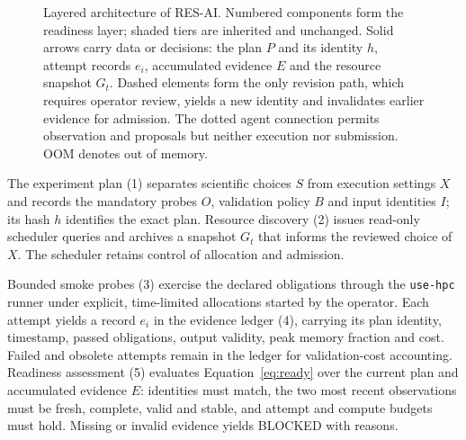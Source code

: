 \documentclass[pdflatex,sn-mathphys-num]{sn-jnl}
\theoremstyle{thmstylethree}
\newcommand{\tool}{\textsc{RES-AI}}
\newcommand{\upstream}{\texttt{use-hpc}}
\newcommand{\code}[1]{\texttt{#1}}
\begin{document}
\begin{figure}[t]


\caption{Layered architecture of \tool{}. Numbered components form the readiness layer; shaded tiers are inherited and unchanged. Solid arrows carry data or decisions: the plan $P$ and its identity $h$, attempt records $e_i$, accumulated evidence $E$ and the resource snapshot $G_t$. Dashed elements form the only revision path, which requires operator review, yields a new identity and invalidates earlier evidence for admission. The dotted agent connection permits observation and proposals but neither execution nor submission. OOM denotes out of memory.}\label{fig:approach-overview}
\end{figure}

The experiment plan (1) separates scientific choices $S$ from execution settings $X$ and records the mandatory probes $O$, validation policy $B$ and input identities $I$; its hash $h$ identifies the exact plan. Resource discovery (2) issues read-only scheduler queries and archives a snapshot $G_t$ that informs the reviewed choice of $X$. The scheduler retains control of allocation and admission.

Bounded smoke probes (3) exercise the declared obligations through the \upstream{} runner under explicit, time-limited allocations started by the operator. Each attempt yields a record $e_i$ in the evidence ledger (4), carrying its plan identity, timestamp, passed obligations, output validity, peak memory fraction and cost. Failed and obsolete attempts remain in the ledger for validation-cost accounting. Readiness assessment (5) evaluates Equation~\eqref{eq:ready} over the current plan and accumulated evidence $E$: identities must match, the two most recent observations must be fresh, complete, valid and stable, and attempt and compute budgets must hold. Missing or invalid evidence yields BLOCKED with reasons.
\end{document}
